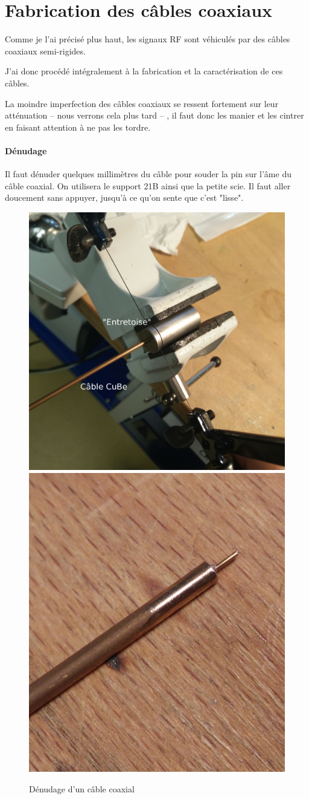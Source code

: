 \section{Fabrication des câbles coaxiaux}
Comme je l'ai précisé plus haut, les signaux RF sont véhiculés par des câbles coaxiaux semi-rigides.

J'ai donc procédé intégralement à la fabrication et la caractérisation de ces câbles.

La moindre imperfection des câbles coaxiaux se ressent fortement sur leur atténuation -- nous verrons cela plus tard -- , il faut donc les manier et les cintrer en faisant attention à ne pas les tordre.

\paragraph*{Dénudage} Il faut dénuder quelques millimètres du câble pour souder la pin sur l’âme du
câble coaxial. On utilisera le support 21B ainsi que la petite scie. Il faut aller doucement
sans appuyer, jusqu’à ce qu’on sente que c’est "lisse".
\begin{figure}[h]
    \begin{center}
        \includegraphics[height=0.48\textwidth]{Images/Coax/1}
        \quad
        \includegraphics[height=0.48\textwidth]{Images/Coax/2}
        \caption{Dénudage d'un câble coaxial}
        \label{coax_denudage}
    \end{center}
\end{figure}

